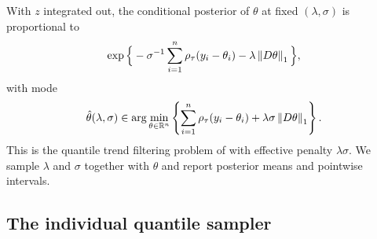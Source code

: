 With $z$ integrated out, the conditional posterior of $\theta$ at fixed $(\lambda, \sigma)$ is proportional to
\[
    \exp\Big\{-\sigma^{-1}\sum_{i=1}^n \rho_\tau(y_i-\theta_i) - \lambda\left\lVert D\theta\right\rVert_1\Big\},
\]
with mode
\begin{equation}
    \hat{\theta}(\lambda, \sigma) \in \arg\min_{\theta \in \mathbb{R}^n} \left\{ \sum_{i=1}^n \rho_\tau(y_i-\theta_i) + \lambda\sigma \left\lVert D\theta\right\rVert_1 \right\}.
    \label{eq:map_qtf}
\end{equation}
This is the quantile trend filtering problem of \citet{brantley2020baseline} with effective penalty $\lambda\sigma$. We sample $\lambda$ and $\sigma$ together with $\theta$ and report posterior means and pointwise intervals.

\subsection{The individual quantile sampler}
\label{subsec:individual}

